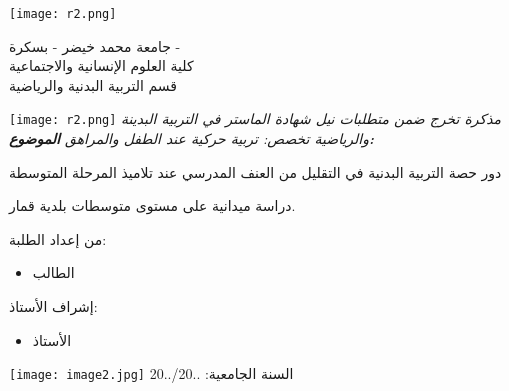 \documentclass[12pt]{article}
\begin{document}
\BgThispage
\begin{titlepage}
\begin{center}
\vspace*{5mm}
\texttt{[image: r2.png]}
\parbox[b][3cm][t]{8cm}{\centering
جامعة محمد خيضر - بسكرة -\\[2mm] كلية العلوم الإنسانية والاجتماعية\\[3mm] قسم التربية البدنية والرياضية
}
\texttt{[image: r2.png]}
\vskip1cm
\textit{\centering
مذكرة تخرج ضمن متطلبات نيل شهادة الماستر في التربية البدينة والرياضية
\vskip3mm
تخصص: تربية حركية عند الطفل والمراهق
\vskip1cm
\textbf{
الموضوع:
}}
\begin{tcolorbox}[enhanced,sharp corners=uphill,
	colback=white!50!white,colframe=blue!25!black,coltext=black,
	fontupper=\Large\bfseries,arc=6mm,boxrule=2mm,boxsep=5mm,
	borderline={0.3mm}{0.3mm}{white}]\centering
	دور حصة التربية البدنية في التقليل من العنف المدرسي عند تلاميذ المرحلة المتوسطة
\end{tcolorbox}
\centering
\vskip3mm
دراسة ميدانية على مستوى متوسطات بلدية قمار.
\vskip1cm
\begin{minipage}{3cm}
من إعداد الطلبة:\\
\begin{itemize}
	\item الطالب
\end{itemize}
\end{minipage}
\hfill
\begin{minipage}{3cm}
إشراف الأستاذ:\\
\begin{itemize}
	\item الأستاذ
\end{itemize}
\end{minipage}
\vfill
\texttt{[image: image2.jpg]}
\vfill
\centering
السنة الجامعية:
..20/..20
\end{center}
\end{titlepage}
\end{document}
